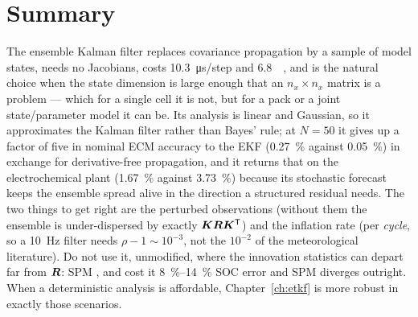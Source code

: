 \section{Summary}
The ensemble Kalman filter replaces covariance propagation by a sample of model states, needs no
Jacobians, costs \SI{10.3}{\micro\second}/step and \SI{6.8}{\kilo\byte}, and is the natural choice
when the state dimension is large enough that an $n_x\times n_x$ matrix is a problem --- which for a
single cell it is not, but for a pack or a joint state/parameter model it can be.  Its analysis is
linear and Gaussian, so it approximates the Kalman filter rather than Bayes' rule; at $N=50$ it
gives up a factor of five in nominal ECM accuracy to the EKF (\SI{0.27}{\percent} against
\SI{0.05}{\percent}) in exchange for derivative-free propagation, and it returns that on the
electrochemical plant (\SI{1.67}{\percent} against \SI{3.73}{\percent}) because its stochastic
forecast keeps the ensemble spread alive in the direction a structured residual needs.  The two
things to get right are the perturbed observations (without them the ensemble is under-dispersed by
exactly $\bm{K}\bm{R}\bm{K}^{\mathsf{T}}$) and the inflation rate (per \emph{cycle}, so a \SI{10}{\hertz} filter needs
$\rho-1 \sim 10^{-3}$, not the $10^{-2}$ of the meteorological literature).  Do not use it, unmodified,
where the innovation statistics can depart far from $\bm{R}$: SPM ,
 and  cost it \SIrange{8}{14}{\percent} SOC error and SPM
 diverges outright.  When a deterministic analysis is affordable, Chapter~\ref{ch:etkf}
is more robust in exactly those scenarios.
